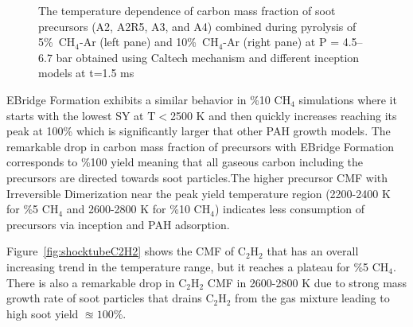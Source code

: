 \begin{figure}[H]
\begin{subfigure}[t]{0.4\textwidth}
	\end{subfigure}
	\caption{The temperature dependence of carbon mass fraction of soot precursors (A2, A2R5, A3, and A4) combined during pyrolysis of 5\%~$\mathrm{CH_4}$-Ar (left pane) and 10\%~$\mathrm{CH_4}$-Ar (right pane) at $\mathrm{P}$ = 4.5–6.7 bar obtained using Caltech mechanism and different inception models at t=1.5 ms}
	\label{fig:shocktubeAAAA} 
\end{figure}

EBridge Formation exhibits a similar behavior in \%10 $\mathrm{CH_4}$ simulations where it starts with the lowest SY at T$<$2500 K and then quickly increases reaching its peak at 100\% which is significantly larger that other PAH growth models. The remarkable drop in carbon mass fraction of precursors with EBridge Formation corresponds to \%100 yield meaning that all gaseous carbon including the precursors are directed towards soot particles.The higher precursor CMF with Irreversible Dimerization near the peak yield temperature region (2200-2400 K for \%5 $\mathrm{CH_4}$ and 2600-2800 K for \%10 $\mathrm{CH_4}$) indicates less consumption of precursors via inception and PAH adsorption.

Figure~\ref{fig:shocktubeC2H2} shows the CMF of $\mathrm{C_2H_2}$ that has an overall increasing trend in the temperature range, but it reaches a plateau for \%5 $\mathrm{CH_4}$. There is also a remarkable drop in $\mathrm{C_2H_2}$ CMF in 2600-2800 K due to strong mass growth rate of soot particles that drains $\mathrm{C_2H_2}$ from the gas mixture leading to high soot yield $\approxeq 100\%$. 


